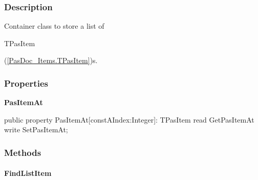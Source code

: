 \documentclass{report}
\newif\ifpdf
\begin{document}
\subsubsection*{\large{\textbf{Description}}\normalsize\hspace{1ex}\hfill}
Container class to store a list of \begin{ttfamily}TPasItem\end{ttfamily}(\ref{PasDoc_Items.TPasItem})s.\subsubsection*{\large{\textbf{Properties}}\normalsize\hspace{1ex}\hfill}
\begin{list}{}{
\setlength{\itemindent}{0cm}
\setlength{\listparindent}{0cm}
\setlength{\leftmargin}{\evensidemargin}
\addtolength{\leftmargin}{\tmplength}
\settowidth{\labelsep}{X}
\addtolength{\leftmargin}{\labelsep}
\setlength{\labelwidth}{\tmplength}
}
\label{PasDoc_Items.TPasItems-PasItemAt}
\item[\textbf{PasItemAt}\hfill]
\ifpdf
\begin{flushleft}
\fi
\begin{ttfamily}
public property PasItemAt[constAIndex:Integer]: TPasItem read GetPasItemAt
      write SetPasItemAt;\end{ttfamily}

\ifpdf
\end{flushleft}
\fi


\par  \end{list}
\subsubsection*{\large{\textbf{Methods}}\normalsize\hspace{1ex}\hfill}
\paragraph*{FindListItem}\hspace*{\fill}
\end{document}
